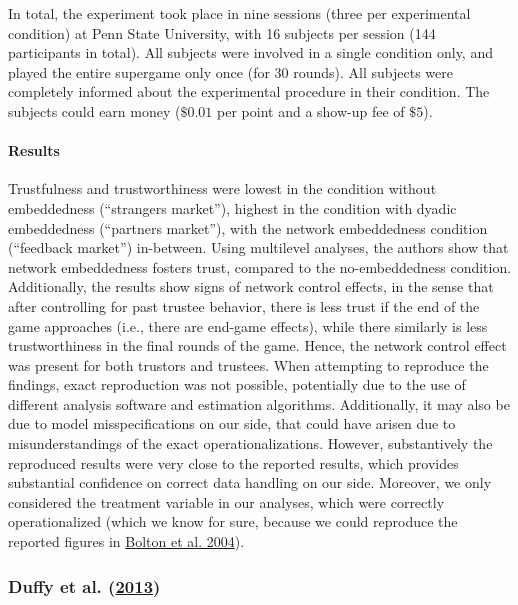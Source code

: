 \documentclass[
  11pt,
]{article}
\begin{document}
In total, the experiment took place in nine sessions (three per experimental condition) at Penn State University, with 16 subjects per session (144 participants in total). All subjects were involved in a single condition only, and played the entire supergame only once (for 30 rounds). All subjects were completely informed about the experimental procedure in their condition. The subjects could earn money (\(\$0.01\) per point and a show-up fee of \(\$5\)).

\hypertarget{results-1}{%
\paragraph{Results}\label{results-1}}

Trustfulness and trustworthiness were lowest in the condition without embeddedness (``strangers market''), highest in the condition with dyadic embeddedness (``partners market''), with the network embeddedness condition (``feedback market'') in-between.
Using multilevel analyses, the authors show that network embeddedness fosters trust, compared to the no-embeddedness condition.
Additionally, the results show signs of network control effects, in the sense that after controlling for past trustee behavior, there is less trust if the end of the game approaches (i.e., there are end-game effects), while there similarly is less trustworthiness in the final rounds of the game.
Hence, the network control effect was present for both trustors and trustees.
When attempting to reproduce the findings, exact reproduction was not possible, potentially due to the use of different analysis software and estimation algorithms.
Additionally, it may also be due to model misspecifications on our side, that could have arisen due to misunderstandings of the exact operationalizations.
However, substantively the reproduced results were very close to the reported results, which provides substantial confidence on correct data handling on our side.
Moreover, we only considered the treatment variable in our analyses, which were correctly operationalized (which we know for sure, because we could reproduce the reported figures in \protect\hyperlink{ref-bolton_electronic_2004}{Bolton et al. 2004}).

\hypertarget{duffy2013social}{%
\subsubsection{\texorpdfstring{Duffy et al. (\protect\hyperlink{ref-duffy2013social}{2013})}{Duffy et al. (2013)}}\label{duffy2013social}}
\end{document}
